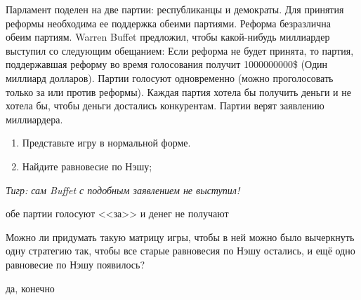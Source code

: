 \begin{problem}
\begin{source}
\cite{miller:gtw}
\end{source}
Парламент поделен на две партии: республиканцы и демократы. Для принятия реформы необходима ее поддержка обеими партиями. Реформа безразлична обеим партиям. Warren Buffet предложил, чтобы какой-нибудь миллиардер выступил со следующим обещанием: Если реформа не будет принята, то партия, поддержавшая реформу во время голосования получит 1000000000\$ (Один миллиард долларов). Партии голосуют одновременно (можно проголосовать только за или против реформы). Каждая партия хотела бы получить деньги и не хотела бы, чтобы деньги достались конкурентам. Партии верят заявлению миллиардера.\par
\begin{enumerate}
\item  Представьте игру в нормальной форме.\par
\item Найдите равновесие по Нэшу;\par
\end{enumerate}
{\it Тигр: сам Buffet  с подобным заявлением не выступил!}




\begin{sol}
обе партии голосуют <<за>> и денег не получают
\end{sol}
\end{problem}






\begin{problem}
 Можно ли придумать такую матрицу игры, чтобы в ней можно было вычеркнуть одну стратегию так, чтобы все старые равновесия по Нэшу остались, и ещё одно равновесие по Нэшу появилось?

\begin{sol}
 да, конечно
\end{sol}
\end{problem}





